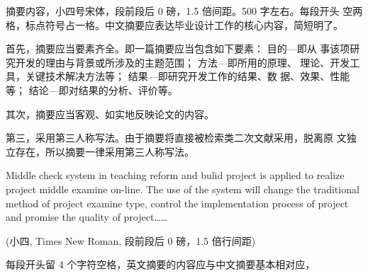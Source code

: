 
\begin{abstractcn}
摘要内容，小四号宋体，段前段后 0 磅，1.5 倍间距。500 字左右。每段开头
空两格，标点符号占一格。中文摘要应表达毕业设计工作的核心内容，简短明了。

首先，摘要应当要素齐全。即一篇摘要应当包含如下要素： 目的—即从
事该项研究开发的理由与背景或所涉及的主题范围； 方法—即所用的原理、
理论、开发工具，关键技术解决方法等； 结果—即研究开发工作的结果、数
据、效果、性能等； 结论—即对结果的分析、评价等。

其次，摘要应当客观、如实地反映论文的内容。

第三，采用第三人称写法。由于摘要将直接被检索类二次文献采用，脱离原
文独立存在，所以摘要一律采用第三人称写法。

\end{abstractcn}

\begin{abstracten}
Middle check system in teaching reform and bulid project is applied to realize
project middle examine on-line. The use of the system will change the traditional
method of project examine type, control the implementation process of project and
promise the quality of project……

(小四, Times New Roman, 段前段后 0 磅，1.5 倍行间距)

每段开头留 4 个字符空格，英文摘要的内容应与中文摘要基本相对应，

\end{abstracten}
